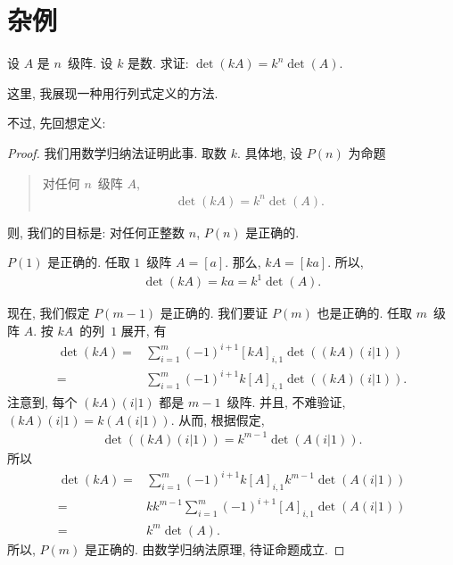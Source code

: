 \section{杂例}

\begin{example}
    设 \(A\) 是 \(n\)~级阵.
    设 \(k\) 是数.
    求证: \(\det {(kA)} = k^n \det {(A)}\).
\end{example}

这里, 我展现一种用行列式定义的方法.

不过, 先回想定义:

\DefinitionDeterminants*

\begin{proof}
    我们用数学归纳法证明此事.
    取数 \(k\).
    具体地, 设 \(P(n)\) 为命题
    \begin{quotation}
        对任何 \(n\)~级阵 \(A\),
        \begin{align*}
            \det {(kA)} = k^n \det {(A)}.
        \end{align*}
    \end{quotation}
    则, 我们的目标是:
    对任何正整数 \(n\), \(P(n)\) 是正确的.

    \(P(1)\) 是正确的.
    任取 \(1\)~级阵 \(A = [a]\).
    那么, \(kA = [ka]\).
    所以,
    \begin{align*}
        \det {(kA)} = ka = k^1 \det {(A)}.
    \end{align*}

    现在, 我们假定 \(P(m-1)\) 是正确的.
    我们要证 \(P(m)\) 也是正确的.
    任取 \(m\)~级阵 \(A\).
    按 \(kA\)~的列~\(1\) 展开, 有
    \begin{align*}
        \det {(kA)}
        = {} & \sum_{i = 1}^{m}
        {(-1)^{i+1} [kA]_{i,1} \det {((kA) (i|1))}}
        \\
        = {} & \sum_{i = 1}^{m}
        {(-1)^{i+1} k [A]_{i,1} \det {((kA) (i|1))}}.
    \end{align*}
    注意到, 每个 \((kA)(i|1)\) 都是 \(m-1\)~级阵.
    并且, 不难验证, \((kA)(i|1) = k(A(i|1))\).
    从而, 根据假定,
    \begin{align*}
        \det {((kA)(i|1))} = k^{m-1} \det {(A(i|1))}.
    \end{align*}
    所以
    \begin{align*}
        \det {(kA)}
        = {} & \sum_{i = 1}^{m}
        {(-1)^{i+1} k [A]_{i,1} k^{m-1} \det {(A(i|1))}}
        \\
        = {} & k k^{m-1}
        \sum_{i = 1}^{m}
        {(-1)^{i+1} [A]_{i,1} \det {(A(i|1))}}
        \\
        = {} & k^m \det {(A)}.
    \end{align*}
    所以, \(P(m)\) 是正确的.
    由数学归纳法原理, 待证命题成立.
\end{proof}


